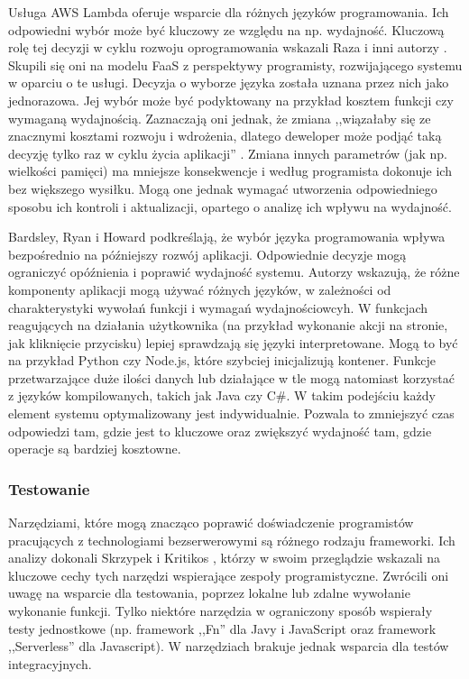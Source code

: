 Usługa AWS Lambda oferuje wsparcie dla różnych języków programowania. 
Ich odpowiedni wybór może być kluczowy ze względu na np. wydajność.
Kluczową rolę tej decyzji w cyklu rozwoju oprogramowania wskazali Raza i inni autorzy \cite{raza2021sok}.
Skupili się oni na modelu FaaS z perspektywy programisty, rozwijającego systemu w oparciu o te usługi.
Decyzja o wyborze języka została uznana przez nich jako jednorazowa.
Jej wybór może być podyktowany na przykład kosztem funkcji czy wymaganą wydajnością.
Zaznaczają oni jednak, że zmiana ,,wiązałaby się ze znacznymi kosztami rozwoju i wdrożenia, dlatego deweloper może podjąć taką decyzję tylko raz w cyklu życia aplikacji'' \cite{raza2021sok}.
Zmiana innych parametrów (jak np. wielkości pamięci) ma mniejsze konsekwencje i według programista dokonuje ich bez większego wysiłku.
Mogą one jednak wymagać utworzenia odpowiedniego sposobu ich kontroli i aktualizacji, opartego o analizę ich wpływu na wydajność.

Bardsley, Ryan i Howard \cite{8513710} podkreślają, że wybór języka programowania wpływa bezpośrednio na późniejszy rozwój aplikacji. 
Odpowiednie decyzje mogą ograniczyć opóźnienia i poprawić wydajność systemu. 
Autorzy wskazują, że różne komponenty aplikacji mogą używać różnych języków, w zależności od charakterystyki wywołań funkcji i wymagań wydajnościowcyh. 
W funkcjach reagujących na działania użytkownika (na przykład wykonanie akcji na stronie, jak kliknięcie przycisku) lepiej sprawdzają się języki interpretowane.
Mogą to być na przykład Python czy Node.js, które szybciej inicjalizują kontener. 
Funkcje przetwarzające duże ilości danych lub działające w tle mogą natomiast korzystać z języków kompilowanych, takich jak Java czy C\#.
W takim podejściu każdy element systemu optymalizowany jest indywidualnie. 
Pozwala to zmniejszyć czas odpowiedzi tam, gdzie jest to kluczowe oraz zwiększyć wydajność tam, gdzie operacje są bardziej kosztowne.

\subsubsection*{Testowanie}

Narzędziami, które mogą znacząco poprawić doświadczenie programistów pracujących z technologiami bezserwerowymi są różnego rodzaju frameworki. 
Ich analizy dokonali Skrzypek i Kritikos \cite{8605774}, którzy w swoim przeglądzie wskazali na kluczowe cechy tych narzędzi wspierające zespoły programistyczne.
Zwrócili oni uwagę na wsparcie dla testowania, poprzez lokalne lub zdalne wywołanie wykonanie funkcji.
Tylko niektóre narzędzia w ograniczony sposób wspierały testy jednostkowe (np. framework ,,Fn'' dla Javy i JavaScript oraz framework ,,Serverless'' dla Javascript).
W narzędziach brakuje jednak wsparcia dla testów integracyjnych.

